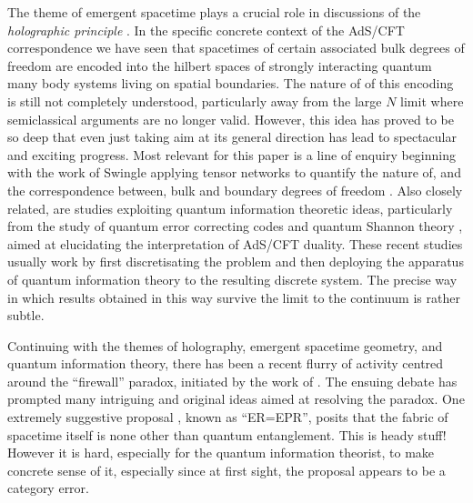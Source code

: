 \documentclass[11pt]{amsart}
\theoremstyle{plain}%
\theoremstyle{definition}
\theoremstyle{remark}
\begin{document}
The theme of emergent spacetime plays a crucial role in discussions of the \emph{holographic principle} \cite{bousso_holographic_2002}. In the specific concrete context of the AdS/CFT correspondence \cite{maldacena_large_1999} we have seen that spacetimes of certain associated bulk degrees of freedom are encoded into the hilbert spaces of strongly interacting quantum many body systems living on spatial boundaries. The nature of of this encoding is still not completely understood, particularly away from the large $N$ limit where semiclassical arguments are no longer valid. However, this idea has proved to be so deep that even just taking aim at its general direction has lead to spectacular and exciting progress. Most relevant for this paper is a line of enquiry beginning with the work of Swingle \cite{swingle_entanglement_2012} applying tensor networks to quantify the nature of, and the correspondence between, bulk and boundary degrees of freedom \cite{nozaki_holographic_2012,ryu_aspects_2006,ryu_holographic_2006}. Also closely related, are studies exploiting quantum information theoretic ideas, particularly from the study of quantum error correcting codes \cite{almheiri_bulk_2014} and quantum Shannon theory \cite{czech_information_2014}, aimed at elucidating the interpretation of AdS/CFT duality. These recent studies usually work by first discretisating the problem and then deploying the apparatus of quantum information theory to the resulting discrete system. The precise way in which results obtained in this way survive the limit to the continuum is rather subtle.

Continuing with the themes of holography, emergent spacetime geometry, and quantum information theory, there has been a recent flurry of activity centred around the ``firewall'' paradox, initiated by the work of \cite{almheiri_black_2013}. The ensuing debate has prompted many intriguing and original ideas aimed at resolving the paradox. One extremely suggestive proposal \cite{maldacena_cool_2013}, known as ``ER=EPR'', posits that the fabric of spacetime itself is none other than quantum entanglement. This is heady stuff! However it is hard, especially for the quantum information theorist, to make concrete sense of it, especially since at first sight, the proposal appears to be a category error. 
\end{document}
